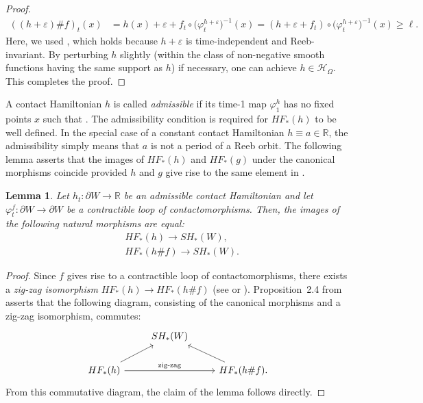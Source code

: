 \documentclass[pdftex]{sigma}
\numberwithin{equation}{section}
\newtheorem{Lemma}[Theorem]{Lemma}
\theoremstyle{definition}
\begin{document}
\begin{proof}
\begin{align*}
((h + \varepsilon)\# f)_t(x) &= h(x) +\varepsilon + f_t\circ\bigl(\varphi^{h+\varepsilon}_t\bigr)^{-1}(x) = (h +\varepsilon + f_t)\circ\bigl(\varphi^{h+\varepsilon}_t\bigr)^{-1}(x) \geqslant \ell.
\end{align*}
Here, we used , which holds because $h+\varepsilon$ is time-independent and Reeb-invariant. By perturbing $h$ slightly {(within the class of non-negative smooth functions having the same support as $h$)} if necessary, one can achieve $h\in\mathcal{H}_\Omega$. This completes the proof.
\end{proof}

A contact Hamiltonian $h$ is called \emph{admissible}\label{def:admissible} if its time-1 map $\varphi^h_1$ has no fixed points $x$ such that . The admissibility condition is required for $HF_\ast(h)$ to be well defined. In the special case of a constant contact Hamiltonian $h\equiv a\in \mathbb{R}$, the admissibility simply means that $a$ is not a period of a Reeb orbit.
The following lemma asserts that the images of $HF_\ast(h)$ and $HF_\ast(g)$ under the canonical morphisms coincide provided $h$ and $g$ give rise to the same element in .

\begin{Lemma}\label{lem:compwithcontractible}
Let $h_t\colon \partial W\to \mathbb{R}$ be an admissible contact Hamiltonian and let $\varphi^f_t\colon \partial W\to\partial W$ be a contractible loop of contactomorphisms. Then, the images of the following natural morphisms are equal:
\begin{align*}
& HF_\ast(h)\to SH_\ast(W),\\
& HF_\ast(h\#f)\to SH_\ast(W).
\end{align*}
\end{Lemma}
\begin{proof}
Since $f$ gives rise to a contractible loop of contactomorphisms, there exists a {\emph{zig-zag isomorphism}} $HF_\ast(h)\to HF_\ast(h\# f)$ (see \cite[Section~9]{uljarevic2023selective} or \cite[Section~2.1.3]{djordjevic2025quantitative}). Proposition~2.4 from \cite{djordjevic2025quantitative} asserts that the following diagram, consisting of the canonical morphisms and a zig-zag isomorphism, commutes:
\[\begin{tikzcd}
&SH_\ast(W)&\\
HF_\ast(h)\arrow["\text{zig-zag}"]{rr}\arrow{ru}&&HF_\ast(h\#f).\arrow{lu}
\end{tikzcd}\]
From this commutative diagram, the claim of the lemma follows directly.
\end{proof}
\end{document}
